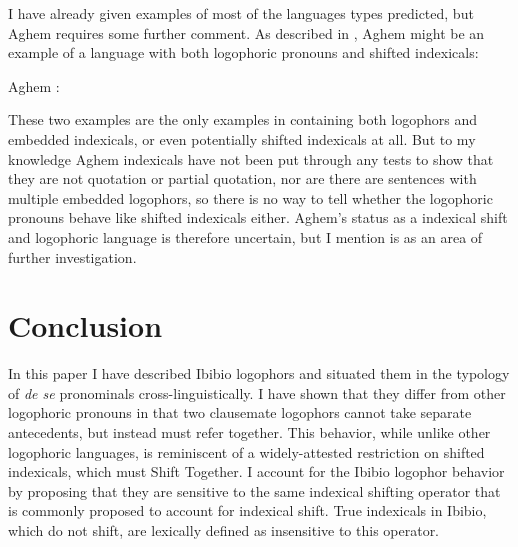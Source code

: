\documentclass[output=paper]{langscibook}
\begin{document}
I have already given examples of most of the languages types predicted, but Aghem requires some further comment. As described in \citet{Hyman1979}, Aghem might be an example of a language with both logophoric pronouns and shifted indexicals:
\begin{exe}
\ex\label{aghem} Aghem \citep[14]{Hyman1979}:
\begin{xlist}%
	
\end{xlist}
\end{exe}
These two examples are the only examples in \citet{Hyman1979} containing both logophors and embedded indexicals, or even potentially shifted indexicals at all. But to my knowledge Aghem indexicals have not been put through any tests to show that they are not quotation or partial quotation, nor are there are sentences with multiple embedded logophors, so there is no way to tell whether the logophoric pronouns behave like shifted indexicals either. Aghem's status as a indexical shift and logophoric language is therefore uncertain, but I mention is as an area of further investigation.




\section{Conclusion}

In this paper I have described Ibibio logophors and situated them in the typology of \textit{de se} pronominals cross-linguistically. I have shown that they differ from other logophoric pronouns in that two clausemate logophors cannot take separate antecedents, but instead must refer together. This behavior, while unlike other logophoric languages, is reminiscent of a widely-attested restriction on shifted indexicals, which must Shift Together. I account for the Ibibio logophor behavior by proposing that they are sensitive to the same indexical shifting operator that is commonly proposed to account for indexical shift. True indexicals in Ibibio, which do not shift, are lexically defined as insensitive to this operator.
\end{document}
